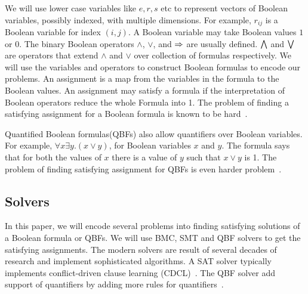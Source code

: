 \noindent We will use lower case variables like $e,r,s$ etc to represent vectors of
Boolean variables, possibly indexed, with multiple dimensions.
%
For example, $r_{ij}$ is a Boolean variable for index $(i,j)$.
%
%
A Boolean variable may take Boolean values $1$ or $0$.
%
The binary Boolean operators $\land$, $\lor$, and $\Rightarrow$ are usually defined.
%
$\bigwedge$ and $\bigvee$ are operators that extend $\land$ and $\lor$ over
collection of formulas respectively.
%
We will use the variables and operators to construct Boolean formulas to
encode our problems.
%
An assignment is a map from the variables in the formula to the Boolean values.
%
An assignment may satisfy a formula if the interpretation of Boolean operators
reduce the whole Formula into 1.
%
The problem of finding a satisfying assignment for a Boolean formula is known to be hard~\cite{cook1971complexity}.
%

Quantified Boolean formulas(QBFs) also allow quantifiers over Boolean variables.
%
For example, $\forall x \exists y. (x \lor y)$, for Boolean variables $x$ and $y$.
%
The formula says that for both the values of $x$ there is a value of $y$
such that $x \lor y$ is 1.
%
The problem of finding satisfying assignment for QBFs is even harder problem~\cite{arora2009computational}.
%

\subsection{Solvers}
\noindent In this paper, we will encode several problems into finding satisfying
solutions of a Boolean formula or QBFs.
%
We will use BMC, SMT and QBF solvers to get the satisfying assignments.
%
The modern solvers are result of several decades of research
and implement sophisticated algorithms.
%
A SAT solver typically implements conflict-driven clause learning (CDCL)~\cite{biere2009conflict}.
The QBF solver add support of quantifiers by adding more rules for quantifiers~\cite{buning2009theory}.

%
%

